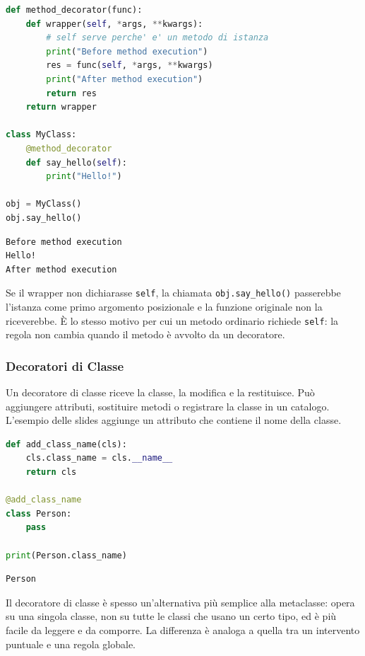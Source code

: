 \documentclass[12pt]{extarticle}
\begin{document}
\begin{lstlisting}[language=Python]
def method_decorator(func):
    def wrapper(self, *args, **kwargs):
        # self serve perche' e' un metodo di istanza
        print("Before method execution")
        res = func(self, *args, **kwargs)
        print("After method execution")
        return res
    return wrapper

class MyClass:
    @method_decorator
    def say_hello(self):
        print("Hello!")

obj = MyClass()
obj.say_hello()
\end{lstlisting}

\begin{lstlisting}[numbers=none]
Before method execution
Hello!
After method execution
\end{lstlisting}

\noindent Se il wrapper non dichiarasse \texttt{self}, la chiamata \texttt{obj.say\_hello()} passerebbe l'istanza come primo argomento posizionale e la funzione originale non la riceverebbe. È lo stesso motivo per cui un metodo ordinario richiede \texttt{self}: la regola non cambia quando il metodo è avvolto da un decoratore.

\subsubsection{Decoratori di Classe}

\noindent Un decoratore di classe riceve la classe, la modifica e la restituisce. Può aggiungere attributi, sostituire metodi o registrare la classe in un catalogo. L'esempio delle slides aggiunge un attributo che contiene il nome della classe.

\begin{lstlisting}[language=Python]
def add_class_name(cls):
    cls.class_name = cls.__name__
    return cls

@add_class_name
class Person:
    pass

print(Person.class_name)
\end{lstlisting}

\begin{lstlisting}[numbers=none]
Person
\end{lstlisting}

\noindent Il decoratore di classe è spesso un'alternativa più semplice alla metaclasse: opera su una singola classe, non su tutte le classi che usano un certo tipo, ed è più facile da leggere e da comporre. La differenza è analoga a quella tra un intervento puntuale e una regola globale.
\end{document}
